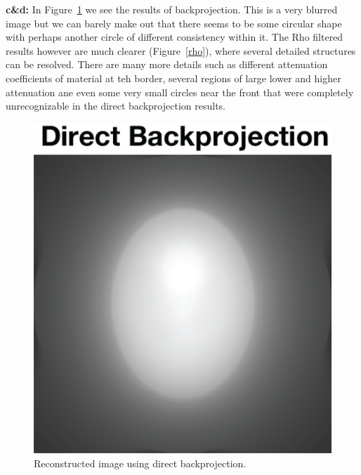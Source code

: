 \documentclass[12pt]{article}
\begin{document}
\noindent\textbf{c\&d: }
In Figure~\ref{direct} we see the results of backprojection. This is a very blurred image but we can barely make out that there seems to be some circular shape with perhaps another circle of different consistency within it. The Rho filtered results however are much clearer (Figure~\ref{rho}), where several detailed structures can be resolved. There are many more details such as different attenuation coefficients of material at teh border, several regions of large lower and higher attenuation ane even some very small circles near the front that were completely unrecognizable in the direct backprojection results.
\begin{figure}[H]
	\includegraphics[width=\textwidth]{direct.png}
	\caption{Reconstructed image using direct backprojection.}
	\label{direct}
\end{figure}
\end{document}
